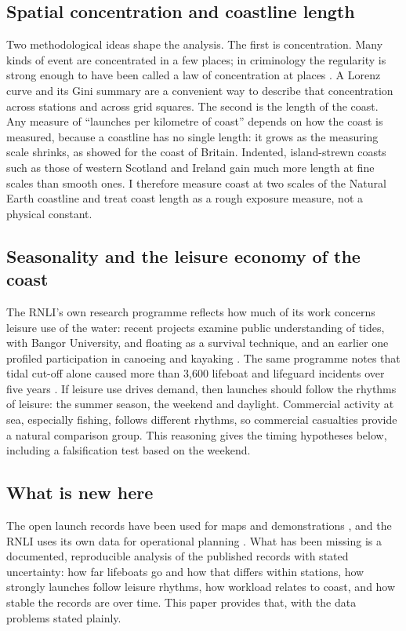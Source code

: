 \documentclass[11pt,a4paper]{article}
\begin{document}
\subsection{Spatial concentration and coastline length}
Two methodological ideas shape the analysis. The first is concentration. Many kinds of event are concentrated in a few places; in criminology the regularity is strong enough to have been called a law of concentration at places \citep{weisburd2015}. A Lorenz curve \citep{lorenz1905} and its Gini summary are a convenient way to describe that concentration across stations and across grid squares. The second is the length of the coast. Any measure of ``launches per kilometre of coast'' depends on how the coast is measured, because a coastline has no single length: it grows as the measuring scale shrinks, as \citet{mandelbrot1967} showed for the coast of Britain. Indented, island-strewn coasts such as those of western Scotland and Ireland gain much more length at fine scales than smooth ones. I therefore measure coast at two scales of the Natural Earth coastline \citep{naturalearth} and treat coast length as a rough exposure measure, not a physical constant.

\subsection{Seasonality and the leisure economy of the coast}
The RNLI's own research programme reflects how much of its work concerns leisure use of the water: recent projects examine public understanding of tides, with Bangor University, and floating as a survival technique, and an earlier one profiled participation in canoeing and kayaking \citep{rnliresearch}. The same programme notes that tidal cut-off alone caused more than 3,600 lifeboat and lifeguard incidents over five years \citep{rnliresearch}. If leisure use drives demand, then launches should follow the rhythms of leisure: the summer season, the weekend and daylight. Commercial activity at sea, especially fishing, follows different rhythms, so commercial casualties provide a natural comparison group. This reasoning gives the timing hypotheses below, including a falsification test based on the weekend.

\subsection{What is new here}
The open launch records have been used for maps and demonstrations \citep{roberts2018}, and the RNLI uses its own data for operational planning \citep{wright2021}. What has been missing is a documented, reproducible analysis of the published records with stated uncertainty: how far lifeboats go and how that differs within stations, how strongly launches follow leisure rhythms, how workload relates to coast, and how stable the records are over time. This paper provides that, with the data problems stated plainly.
\end{document}
